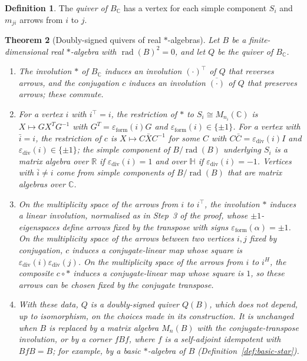 \documentclass[12pt, a4paper]{report}
\theoremstyle{plain}
\newtheorem{theorem}{Theorem}[chapter]
\theoremstyle{definition}
\newtheorem{definition}[theorem]{Definition}
\theoremstyle{remark}
\theoremstyle{plain}
\newcommand{\rad}[0]{\operatorname{rad}} %
\newcommand{\epsilondiv}{\varepsilon_{\mathrm{div}}}
\newcommand{\epsilonform}{\varepsilon_{\mathrm{form}}}
\newcommand{\RR}{\mathbb{R}}
\newcommand{\CC}{\mathbb{C}}
\newcommand{\HH}{\mathbb{H}}
\begin{document}
\begin{definition}\label{def:quiver-of-B}
The \emph{quiver of $B_\CC$} has a vertex for each simple component $S_i$ and $m_{ji}$ arrows from $i$ to $j$.
\end{definition}

\begin{theorem}[Doubly-signed quivers of real $*$-algebras]\label{thm:classification}
Let $B$ be a finite-dimensional real $*$-algebra with $\rad(B)^2=0$, and let $Q$ be the quiver of $B_\CC$.
\begin{enumerate}
  \item The involution $*$ of $B_\CC$ induces an involution $(\cdot)^{\top}$ of $Q$ that reverses arrows, and the conjugation $c$ induces an involution $\overline{(\cdot)}$ of $Q$ that preserves arrows; these commute.
  \item For a vertex $i$ with $i^{\top}=i$, the restriction of $*$ to $S_i\cong M_{n_i}(\CC)$ is $X\mapsto GX^TG^{-1}$ with $G^T=\epsilonform(i)G$ and $\epsilonform(i)\in\{\pm1\}$. For a vertex with $\bar i=i$, the restriction of $c$ is $X\mapsto C\bar XC^{-1}$ for some $C$ with $C\bar C=\epsilondiv(i)I$ and $\epsilondiv(i)\in\{\pm1\}$; the simple component of $B/\rad(B)$ underlying $S_i$ is a matrix algebra over $\RR$ if $\epsilondiv(i)=1$ and over $\HH$ if $\epsilondiv(i)=-1$. Vertices with $\bar i\neq i$ come from simple components of $B/\rad(B)$ that are matrix algebras over $\CC$.
  \item On the multiplicity space of the arrows from $i$ to $i^{\top}$, the involution $*$ induces a linear involution, normalised as in Step~3 of the proof, whose $\pm1$-eigenspaces define arrows fixed by the transpose with signs $\epsilonform(\alpha)=\pm1$. On the multiplicity space of the arrows between two vertices $i,j$ fixed by conjugation, $c$ induces a conjugate-linear map whose square is $\epsilondiv(i)\epsilondiv(j)$. On the multiplicity space of the arrows from $i$ to $i^H$, the composite $c\circ*$ induces a conjugate-linear map whose square is $1$, so these arrows can be chosen fixed by the conjugate transpose.
  \item With these data, $Q$ is a doubly-signed quiver $Q(B)$, which does not depend, up to isomorphism, on the choices made in its construction. It is unchanged when $B$ is replaced by a matrix algebra $M_n(B)$ with the conjugate-transpose involution, or by a corner $fBf$, where $f$ is a self-adjoint idempotent with $BfB=B$; for example, by a basic $*$-algebra of $B$ (Definition~\ref{def:basic-star}).
\end{enumerate}

\end{theorem}
\end{document}
